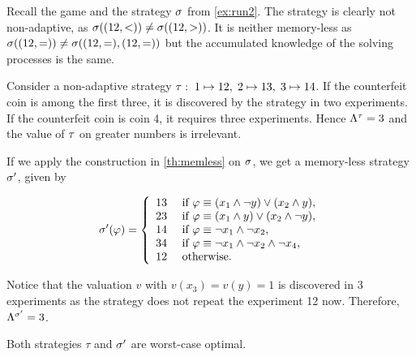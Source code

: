 

\begin{example}
Recall the game and the strategy $\sigma$ from \autoref{ex:run2}.
The strategy is clearly not non-adaptive, as
  $\sigma((12, <)) \not= \sigma((12, >))$.
It is neither memory-less as
  $\sigma((12, =)) \not= \sigma((12,=),(12,=))$ but
  the accumulated knowledge of the solving processes is the same.

Consider a non-adaptive strategy
 $\tau:\; 1 \mapsto 12,\; 2\mapsto 13,\; 3\mapsto 14$.
If the counterfeit coin is among the first three,
  it is discovered by the strategy in two experiments.
If the counterfeit coin is coin 4, it requires three experiments.
Hence $\Lambda^{\tau} = 3$ and the value of $\tau$ on
  greater numbers is irrelevant.

If we apply the construction in \autoref{th:memless} on $\sigma$,
we get a memory-less strategy $\sigma'$, given by

\[
\sigma'(\varphi) = \left\{\begin{array}{ll}
13 & \textrm{ if } \varphi \equiv (x_1 \wedge \neg y) \vee (x_2 \wedge y), \\
23 & \textrm{ if } \varphi \equiv (x_1 \wedge y) \vee (x_2 \wedge \neg y),\\
14 & \textrm{ if } \varphi \equiv \neg x_1 \wedge \neg x_2, \\
34 & \textrm{ if } \varphi \equiv \neg x_1 \wedge \neg x_2 \wedge \neg x_4, \\
12 & \textrm{ otherwise.}
\end{array}\right.
\]

Notice that the valuation $v$ with $v(x_3) = v(y) = 1$ is discovered in
  3 experiments as the strategy does not repeat the experiment 12 now.
Therefore, $\Lambda^{\sigma'} = 3$.

Both strategies $\tau$ and $\sigma'$ are worst-case optimal. \eqed
\end{example}

